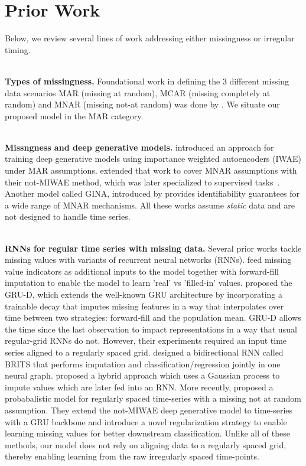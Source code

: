 \section{Prior Work}
Below, we review several lines of work addressing either missingness or irregular timing.

~\\ \noindent
\textbf{Types of missingness.}
Foundational work in defining the 3 different missing data scenarios MAR (missing at random), MCAR (missing completely at random) and MNAR (missing  not-at random) was done by \citet{rubin1976inference}. 
We situate our proposed model in the MAR category.

~\\ \noindent \textbf{Missngness and deep generative models.} 
\citet{mattei2019miwae} introduced an approach for training deep generative models using importance weighted autoencoders (IWAE) under MAR assumptions. \citet{ipsen2020not} extended that work to cover MNAR assumptions with their not-MIWAE method, which was later specialized to supervised tasks~\citep{ipsen2022deal}. 
Another model called GINA, introduced by \cite{ma2021identifiable} provides identifiability guarantees 
for a wide range of MNAR mechanisms. All these works assume  \emph{static} data and are not designed to handle time series. 

~\\
\noindent \textbf{RNNs for regular time series with missing data.} Several prior works tackle missing values with variants of recurrent neural networks (RNNs). \cite{liptonModelingMissingData2016} feed missing value indicators as additional inputs to the model together with forward-fill imputation to enable the model to learn 'real' vs 'filled-in' values. \cite{che2018recurrent} proposed the GRU-D, which extends the well-known GRU architecture \citep{cho2014properties} by incorporating a trainable decay that imputes missing features in a way that interpolates over time between two strategies: forward-fill and the population mean. GRU-D allows the time since the last observation to impact representations in a way that usual regular-grid RNNs do not. However, their experiments required an input time series aligned to a regularly spaced grid.
\cite{caoBRITSBidirectionalRecurrent2018} designed a bidirectional RNN called BRITS that performs imputation and classification/regression jointly in one neural graph. \cite{futomaLearningDetectSepsis2017} proposed a hybrid approach which uses a Gaussian process to impute values which are later fed into an RNN.
More recently, \cite{kim2023probabilistic} proposed a probabalistic  model for regularly spaced time-series with a missing not at random assumption. They extend the not-MIWAE deep generative model \citep{ipsen2022deal} to time-series with a GRU backbone and introduce a novel regularization strategy to enable learning missing values for better downstream classification. Unlike all of these methods, our model does not rely on aligning data to a regularly spaced grid, thereby enabling learning from the raw irregularly spaced time-points.  

